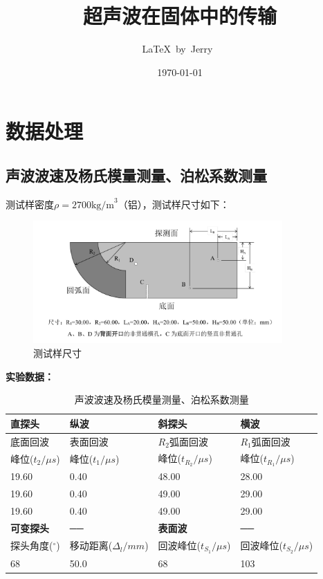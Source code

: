 \documentclass[UTF8]{ctexart}
\title{超声波在固体中的传输}
\author{\LaTeX\ by\ Jerry\ }
\date{\today}
\begin{document}
\fancyfoot[C]{\thepage}

\maketitle
\tableofcontents
\newpage

\section{数据处理}

\subsection{声波波速及杨氏模量测量、泊松系数测量}

测试样密度\(\rho=2700\text{kg/m}^3\)（铝），测试样尺寸如下：

\begin{figure}[H]
    \centering
    \includegraphics[width=0.85\textwidth]{img/sample.png}
    \caption{测试样尺寸}
    \label{fig:size}
\end{figure}

\textbf{实验数据：}

\begin{table}[!ht]
    \centering
    \caption{声波波速及杨氏模量测量、泊松系数测量}
    \begin{tabular}{|l|l|l|l|}
    \hline
        \textbf{直探头} & \textbf{纵波} & \textbf{斜探头} & \textbf{横波} \\ \hline
        底面回波 & 表面回波 & \(R_2\)弧面回波 & \(R_1\)弧面回波 \\
        峰位(\(t_2/\mu s\)) & 峰位(\(t_1/\mu s\)) & 峰位(\(t_{R_2}/\mu s\)) & 峰位(\(t_{R_1}/\mu s\)) \\ \hline
        19.60 & 0.40 & 48.00 & 28.00 \\ \hline
        19.60 & 0.40 & 49.00 & 29.00 \\ \hline
        19.60 & 0.40 & 49.00 & 29.00 \\ \hline
        \textbf{可变探头} & ── & \textbf{表面波} & ── \\ \hline
        探头角度(\(^{\circ}\)) & 移动距离(\(\Delta_l/mm\)) & 回波峰位(\(t_{S_1}/\mu s\)) & 回波峰位(\(t_{S_2}/\mu s\)) \\ \hline
        68 & 50.0 & 68 & 103 \\ \hline
    \end{tabular}
    \label{table1}
\end{table}
\end{document}
